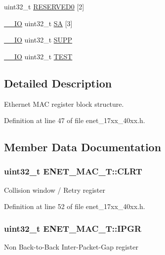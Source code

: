 \begin{DoxyCompactItemize}
\item 
uint32\+\_\+t \hyperlink{structENET__MAC__T_a6e6d5f331b8f5ab0012d265d0a1ff6b1}{R\+E\+S\+E\+R\+V\+E\+D0} \mbox{[}2\mbox{]}
\item 
\hyperlink{core__cm3_8h_aec43007d9998a0a0e01faede4133d6be}{\+\_\+\+\_\+\+IO} uint32\+\_\+t \hyperlink{structENET__MAC__T_a25214ef3698b23b87fea95b7158a11ad}{SA} \mbox{[}3\mbox{]}
\item 
\hyperlink{core__cm3_8h_aec43007d9998a0a0e01faede4133d6be}{\+\_\+\+\_\+\+IO} uint32\+\_\+t \hyperlink{structENET__MAC__T_ad7232a883f980074136d81f8a15d8bb5}{S\+U\+PP}
\item 
\hyperlink{core__cm3_8h_aec43007d9998a0a0e01faede4133d6be}{\+\_\+\+\_\+\+IO} uint32\+\_\+t \hyperlink{structENET__MAC__T_a3ba308b4a368f475aa4b2136faa88f6f}{T\+E\+ST}
\end{DoxyCompactItemize}


\subsection{Detailed Description}
Ethernet M\+AC register block structure. 

Definition at line 47 of file enet\+\_\+17xx\+\_\+40xx.\+h.



\subsection{Member Data Documentation}
\subsubsection[{\texorpdfstring{C\+L\+RT}{CLRT}}]{ uint32\+\_\+t E\+N\+E\+T\+\_\+\+M\+A\+C\+\_\+\+T\+::\+C\+L\+RT}\hypertarget{structENET__MAC__T_afdf0e932f04510c6e77bb13a4592cf13}{}\label{structENET__MAC__T_afdf0e932f04510c6e77bb13a4592cf13}
Collision window / Retry register 

Definition at line 52 of file enet\+\_\+17xx\+\_\+40xx.\+h.

\subsubsection[{\texorpdfstring{I\+P\+GR}{IPGR}}]{ uint32\+\_\+t E\+N\+E\+T\+\_\+\+M\+A\+C\+\_\+\+T\+::\+I\+P\+GR}\hypertarget{structENET__MAC__T_adcccddf8623def0f5a9aeee408312664}{}\label{structENET__MAC__T_adcccddf8623def0f5a9aeee408312664}
Non Back-\/to-\/\+Back Inter-\/\+Packet-\/\+Gap register 

